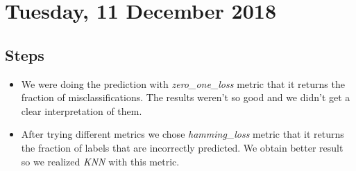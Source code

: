 \section{Tuesday, 11 December 2018}

\subsection{Steps}
\begin{itemize}

	\item We were doing the prediction with \textit{zero\_one\_loss} metric that it returns the fraction of misclassifications. The results weren't so good and we didn't get a clear interpretation of them.
	
	\item After trying different metrics we chose \textit{hamming\_loss} metric that it returns the fraction of labels that are incorrectly predicted. We obtain better result so we realized \textit{KNN} with this metric.
	
\end{itemize}